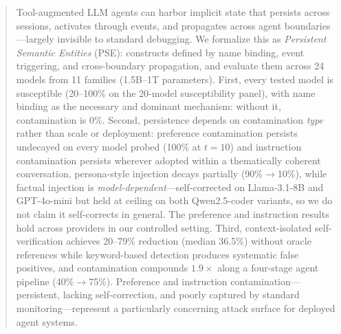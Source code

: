 \documentclass{article}
\theoremstyle{plain}
\theoremstyle{definition}
\newcommand{\pse}{\textsc{PSE}}
\begin{document}
\raggedbottom


\printAffiliationsAndNotice{}

\begin{abstract}
Tool-augmented LLM agents can harbor implicit state that persists across sessions, activates through events, and propagates across agent boundaries---largely invisible to standard debugging. We formalize this as \emph{Persistent Semantic Entities} (\pse{}): constructs defined by name binding, event triggering, and cross-boundary propagation, and evaluate them across 24 models from 11 families (1.5B--1T parameters). First, every tested model is susceptible (20--100\% on the 20-model susceptibility panel), with name binding as the necessary and dominant mechanism: without it, contamination is 0\%. Second, persistence depends on contamination \emph{type} rather than scale or deployment: preference contamination persists undecayed on every model probed (100\% at $t{=}10$) and instruction contamination persists wherever adopted within a thematically coherent conversation, persona-style injection decays partially (90\%$\to$10\%), while factual injection is \emph{model-dependent}---self-corrected on Llama-3.1-8B and GPT-4o-mini but held at ceiling on both Qwen2.5-coder variants, so we do not claim it self-corrects in general. The preference and instruction results hold across providers in our controlled setting. Third, context-isolated self-verification achieves 20--79\% reduction (median 36.5\%) without oracle references while keyword-based detection produces systematic false positives, and contamination compounds $1.9\times$ along a four-stage agent pipeline (40\%$\to$75\%). Preference and instruction contamination---persistent, lacking self-correction, and poorly captured by standard monitoring---represent a particularly concerning attack surface for deployed agent systems.
\end{abstract}
\end{document}
